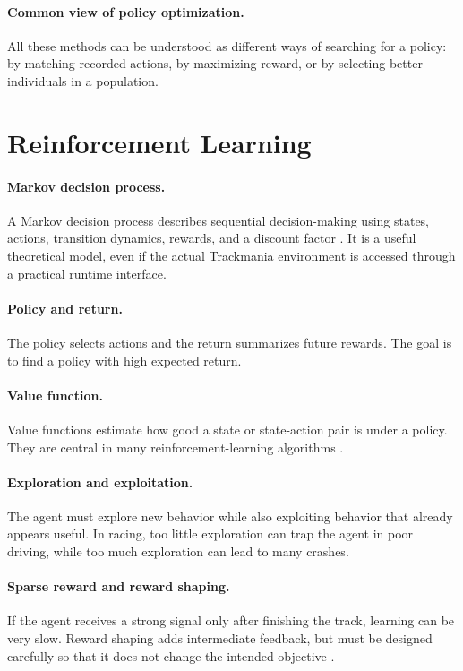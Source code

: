 \paragraph{Common view of policy optimization.}
All these methods can be understood as different ways of searching for a policy: by matching recorded actions, by maximizing reward, or by selecting better individuals in a population.

\section{Reinforcement Learning}

\paragraph{Markov decision process.}
A Markov decision process describes sequential decision-making using states, actions, transition dynamics, rewards, and a discount factor \cite{sutton_barto2018rl}. It is a useful theoretical model, even if the actual Trackmania environment is accessed through a practical runtime interface.

\paragraph{Policy and return.}
The policy selects actions and the return summarizes future rewards. The goal is to find a policy with high expected return.

\paragraph{Value function.}
Value functions estimate how good a state or state-action pair is under a policy. They are central in many reinforcement-learning algorithms \cite{sutton_barto2018rl}.

\paragraph{Exploration and exploitation.}
The agent must explore new behavior while also exploiting behavior that already appears useful. In racing, too little exploration can trap the agent in poor driving, while too much exploration can lead to many crashes.

\paragraph{Sparse reward and reward shaping.}
If the agent receives a strong signal only after finishing the track, learning can be very slow. Reward shaping adds intermediate feedback, but must be designed carefully so that it does not change the intended objective \cite{ng1999shaping}.

